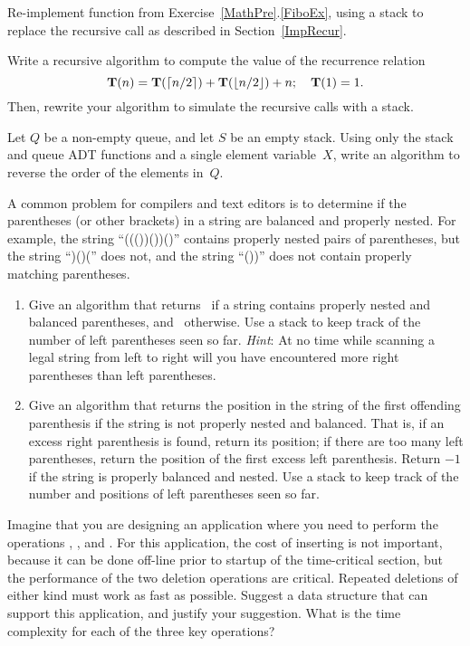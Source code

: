 \begin{exercises}
\item
Re-implement function  from
Exercise~\ref{MathPre}.\ref{FiboEx}, using a
stack to replace the recursive call as described in
Section~\ref{ImpRecur}.

\item
Write a recursive algorithm to compute the value of the recurrence
relation
\[\mbox{$\textbf{T}(n)$} = {\textbf{T}}(\lceil n/2 \rceil) + {\textbf{T}}(\lfloor n/2 \rfloor) + n;
\quad \mbox{$\textbf{T}(1)$} = 1.\]
Then, rewrite your algorithm to simulate the recursive calls with a stack.

\item
Let $Q$ be a non-empty queue, and let $S$ be an empty stack.
Using only the stack and queue ADT functions and a single element
variable~$X$, write an algorithm to reverse the order of the elements
in~$Q$.

\item
{}
A common problem for compilers and text editors is to determine if the
parentheses (or other brackets) in a string are balanced and properly
nested.
For example, the string ``((())())()'' contains properly nested pairs of
parentheses, but the string ``)()('' does not, and the string ``())''
does not contain properly matching parentheses.
\begin{enumerate}
\item
Give an algorithm that returns \TRUE\ if a string
contains properly nested and balanced parentheses, and \FALSE\
otherwise.
Use a stack to keep track of the number of left parentheses seen so far.
\emph{Hint}: At no time while scanning a legal string from left to
right will you have encountered more right parentheses than left
parentheses.

\item
Give an algorithm that returns the position in the string of
the first offending parenthesis if the string is not properly nested
and balanced.
That is, if an excess right parenthesis is found, return its position;
if there are too many left parentheses, return the position of the
first excess left parenthesis.
Return $-1$ if the string is properly balanced and nested.
Use a stack to keep track of the number and positions of left
parentheses seen so far.
\end{enumerate}

\item
Imagine that you are designing an application where you need to
perform the operations ,
, and .
For this application, the cost of inserting is not important, because it
can be done off-line prior to startup of the time-critical section,
but the performance of the two deletion operations are critical.
Repeated deletions of either kind must work as fast as possible.
Suggest a data structure that can support this application, and
justify your suggestion.
What is the time complexity for each of the three key operations?


\end{exercises}
